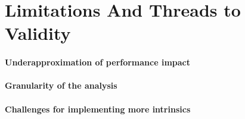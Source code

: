 \section{Limitations And Threads to Validity}


\paragraph{Underapproximation of performance impact}
\paragraph{Granularity of the analysis}
\paragraph{Challenges for implementing more intrinsics}

